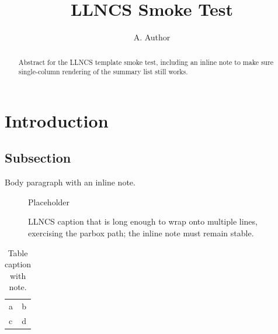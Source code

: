\documentclass{llncs}
\begin{document}
\title{LLNCS Smoke Test}
\author{A. Author}

\maketitle

\begin{abstract}
 Abstract for the LLNCS template smoke test, including
an inline note to make sure single-column rendering of the summary
list still works.
\end{abstract}

\section{Introduction}
\label{sec:intro}
\subsection{Subsection}
Body paragraph with  an inline note. \lipsum[1]

\begin{figure}[t]
  \centering Placeholder
  \caption{LLNCS caption that is long enough to wrap onto multiple
    lines, exercising the parbox path; the inline note must remain
    stable.}
  \label{fig:llncs}
\end{figure}

\begin{table}[t]
  \centering
  \caption{Table caption with note.}
  \label{tab:llncs}
  \begin{tabular}{ll}\hline a & b \\ c & d \\\hline\end{tabular}
\end{table}

\lipsum[2-4]
\end{document}
